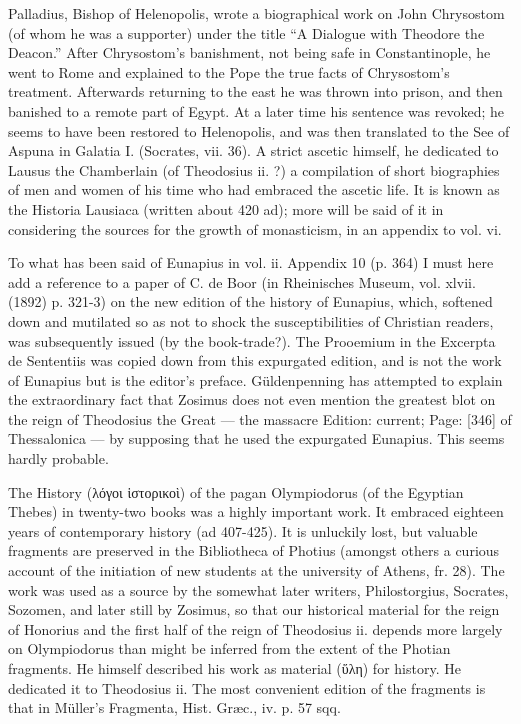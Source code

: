 Palladius, Bishop of Helenopolis, wrote a biographical work on John Chrysostom (of whom he was a supporter) under the title \texthebrew{“}A Dialogue with Theodore the Deacon.\texthebrew{}” After Chrysostom\texthebrew{}’s banishment, not being safe in Constantinople, he went to Rome and explained to the Pope the true facts of Chrysostom\texthebrew{}’s treatment. Afterwards returning to the east he was thrown into prison, and then banished to a remote part of Egypt. At a later time his sentence was revoked; he seems to have been restored to Helenopolis, and was then translated to the See of Aspuna in Galatia I. (Socrates, vii. 36). A strict ascetic himself, he dedicated to Lausus the Chamberlain (of Theodosius ii. ?) a compilation of short biographies of men and women of his time who had embraced the ascetic life. It is known as the Historia Lausiaca (written about 420 ad); more will be said of it in considering the sources for the growth of monasticism, in an appendix to vol. vi.

To what has been said of Eunapius in vol. ii. Appendix 10 (p. 364) I must here add a reference to a paper of C. de Boor (in Rheinisches Museum, vol. xlvii. (1892) p. 321-3) on the new edition of the history of Eunapius, which, softened down and mutilated so as not to shock the susceptibilities of Christian readers, was subsequently issued (by the book-trade?). The Prooemium in the Excerpta de Sententiis was copied down from this expurgated edition, and is not the work of Eunapius but is the editor\texthebrew{}’s preface. Güldenpenning has attempted to explain the extraordinary fact that Zosimus does not even mention the greatest blot on the reign of Theodosius the Great \texthebrew{—} the massacre Edition: current; Page: [346] of Thessalonica \texthebrew{—} by supposing that he used the expurgated Eunapius. This seems hardly probable.

The History (\textgreek{λόγοι \texthebrew{ἱ}στορικο\texthebrew{ὶ}}) of the pagan Olympiodorus (of the Egyptian Thebes) in twenty-two books was a highly important work. It embraced eighteen years of contemporary history (ad 407-425). It is unluckily lost, but valuable fragments are preserved in the Bibliotheca of Photius (amongst others a curious account of the initiation of new students at the university of Athens, fr. 28). The work was used as a source by the somewhat later writers, Philostorgius, Socrates, Sozomen, and later still by Zosimus, so that our historical material for the reign of Honorius and the first half of the reign of Theodosius ii. depends more largely on Olympiodorus than might be inferred from the extent of the Photian fragments. He himself described his work as material (\textgreek{\texthebrew{ὕ}λη}) for history. He dedicated it to Theodosius ii. The most convenient edition of the fragments is that in Müller\texthebrew{}’s Fragmenta, Hist. Græc., iv. p. 57 sqq.

